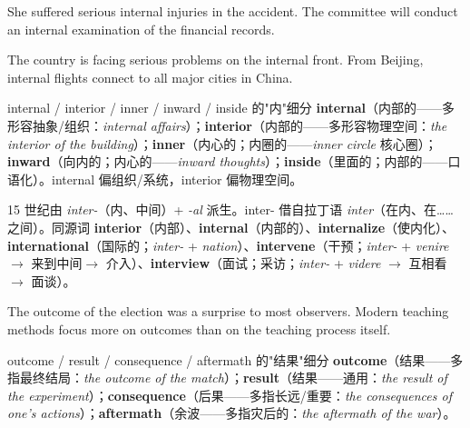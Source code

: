 \documentclass[../main.tex]{subfiles}
\begin{document}

{She suffered serious internal injuries in the accident.}
{The committee will conduct an internal examination of the financial records.}

{The country is facing serious problems on the internal front.}
{From Beijing, internal flights connect to all major cities in China.}

\begin{gram}{internal / interior / inner / inward / inside 的"内"细分}
\textbf{internal}（内部的——多形容抽象/组织：\textit{internal affairs}）；\textbf{interior}（内部的——多形容物理空间：\textit{the interior of the building}）；\textbf{inner}（内心的；内圈的——\textit{inner circle} 核心圈）；\textbf{inward}（向内的；内心的——\textit{inward thoughts}）；\textbf{inside}（里面的；内部的——口语化）。internal 偏组织/系统，interior 偏物理空间。
\end{gram}

\begin{origin}
15 世纪由 \textit{inter-}（内、中间）+ \textit{-al} 派生。inter- 借自拉丁语 \textit{inter}（在内、在……之间）。同源词 \textbf{interior}（内部）、\textbf{internal}（内部的）、\textbf{internalize}（使内化）、\textbf{international}（国际的；\textit{inter-} + \textit{nation}）、\textbf{intervene}（干预；\textit{inter-} + \textit{venire} $\to$ 来到中间$\to$ 介入）、\textbf{interview}（面试；采访；\textit{inter-} + \textit{videre} $\to$ 互相看$\to$ 面谈）。
\end{origin}


{The outcome of the election was a surprise to most observers.}
{Modern teaching methods focus more on outcomes than on the teaching process itself.}

\begin{gram}{outcome / result / consequence / aftermath 的"结果"细分}
\textbf{outcome}（结果——多指最终结局：\textit{the outcome of the match}）；\textbf{result}（结果——通用：\textit{the result of the experiment}）；\textbf{consequence}（后果——多指长远/重要：\textit{the consequences of one's actions}）；\textbf{aftermath}（余波——多指灾后的：\textit{the aftermath of the war}）。
\end{gram}
\end{document}
